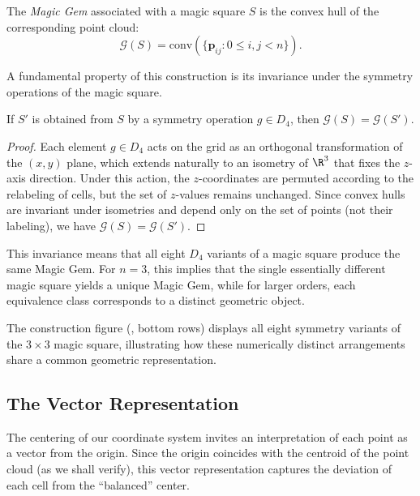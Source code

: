 \begin{definition}
The \emph{Magic Gem} associated with a magic square $S$ is the convex hull of the corresponding point cloud:
\[
\mathcal{G}(S) = \text{conv}\left( \{ \mathbf{p}_{ij} : 0 \leq i, j < n \} \right).
\]
\end{definition}

A fundamental property of this construction is its invariance under the symmetry operations of the magic square.

\begin{proposition}
\label{prop:symmetry_invariance}
If $S'$ is obtained from $S$ by a symmetry operation $g \in D_4$, then $\mathcal{G}(S) = \mathcal{G}(S')$.
\end{proposition}

\begin{proof}
Each element $g \in D_4$ acts on the grid as an orthogonal transformation of the $(x, y)$ plane,
which extends naturally to an isometry of $\R^3$ that fixes the $z$-axis direction.
Under this action, the $z$-coordinates are permuted according to the relabeling of cells,
but the set of $z$-values remains unchanged.
Since convex hulls are invariant under isometries and depend only on the set of points (not their labeling),
we have $\mathcal{G}(S) = \mathcal{G}(S')$.
\end{proof}

This invariance means that all eight $D_4$ variants of a magic square produce the same Magic Gem.
For $n = 3$, this implies that the single essentially different magic square yields a unique Magic Gem,
while for larger orders, each equivalence class corresponds to a distinct geometric object.

The construction figure (, bottom rows) displays all eight symmetry variants of the $3 \times 3$ magic square,
illustrating how these numerically distinct arrangements share a common geometric representation.

\subsection{The Vector Representation}
\label{sec:vector_rep}

The centering of our coordinate system invites an interpretation of each point as a vector from the origin.
Since the origin coincides with the centroid of the point cloud (as we shall verify),
this vector representation captures the deviation of each cell from the ``balanced'' center.

